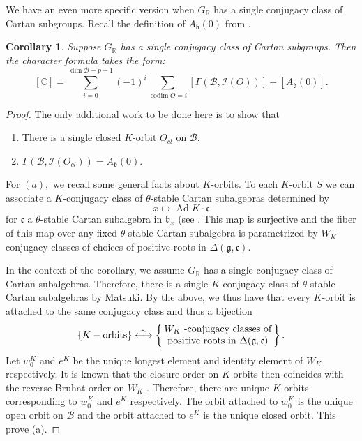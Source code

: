 \documentclass[letterpaper,twosided,11pt]{article}
\theoremstyle{plain}
\newtheorem{corollary}[theorem]{Corollary}
\theoremstyle{definition}
\theoremstyle{remark}
\newcommand{\C}{\mathbb{C}}
\newcommand{\R}{\mathbb{R}}
\newcommand{\lie}[1]{\mathfrak{#1}}
\newcommand{\Ad}{\operatorname{Ad}}
\begin{document}
We have an even more specific version when $ G_\R $ has a single
conjugacy class of Cartan subgroups.  Recall the definition of $ A_\lie{b}
(0) $ from
\cite{VoganZuckerman1984}.

\begin{corollary}
    Suppose $ G_\R $ has a single conjugacy class of Cartan subgroups.
    Then the character formula takes the form:
    \[
        [\C]=\sum_{i=0}^{\dim \mathcal{B}-p-1}(-1)^i\sum_{
        \operatorname{codim}
        O=i}[\Gamma(\mathcal{B},\mathcal{I}(O))]+[A_\lie{b}(0)].
    \]
\end{corollary}
\begin{proof}
    The only additional work to be done here is to show that
    \begin{enumerate}
        \item
            There is a single closed $ K $-orbit $ O_{cl} $ on $
            \mathcal{B}. $
        \item
            $ \Gamma(\mathcal{B},\mathcal{I}(O_{cl}))=A_\lie{b}(0). $
    \end{enumerate}

    For $ (a), $ we recall some general facts about $ K $-orbits.  To
    each $ K $-orbit $ S $ we can associate a $ K $-conjugacy class of $
    \theta $-stable Cartan subalgebras determined by
    \[
        x\mapsto \Ad K\cdot \lie{c}
    \]
    for $ \lie{c} $ a $ \theta $-stable Cartan subalgebra in $ \lie{b}_x
    $ (see
    \cite[Lemmas 5.3-4]{Milicic1993}.  This map is surjective and the
    fiber of this map over any fixed $ \theta $-stable Cartan subalgebra
    is parametrized by $ W_K $-conjugacy classes of choices of positive
    roots in $ \Delta(\lie{g},\lie{c}). $

    In the context of the corollary, we assume $ G_\R $ has a single
    conjugacy class of Cartan subalgebras.  Therefore, there is a single
    $ K $-conjugacy class of $ \theta $-stable Cartan subalgebras by
    Matsuki.  By the above, we thus have that every $ K $-orbit
    is attached to the same conjugacy class and thus a bijection
    \[
        \{ K-\text{orbits}\} \overset{\sim}{\longleftrightarrow} \left\{\parbox
        {4cm}{%
        \centering
        $W_K$ -conjugacy classes of positive roots in $\Delta(\lie{g},\lie
        {c})$ }\right\}.
    \]
    Let $ w_0^K $ and $ e^K $ be the unique longest element and identity
    element of $ W_K $ respectively.  It is known that the closure order
    on $ K $-orbits then coincides with the reverse Bruhat order on $ W_K
    $
    \cite{RichardsonSpringer1990}.  Therefore, there are unique $ K $-orbits
    corresponding to $ w_0^K $ and $ e^K $ respectively.  The orbit
    attached to $ w_0^K $ is the unique open orbit on $ \mathcal{B} $
    and the orbit attached to $ e^K $ is the unique closed orbit.  This
    prove (a).


\end{proof}
\end{document}
